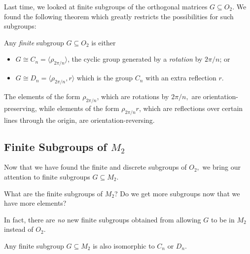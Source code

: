 Last time, we looked at finite subgroups of the orthogonal matrices $G \subseteq O_2.$ We found the following theorem which greatly restricts the possibilities for such subgroups:
\begin{theorem}\label{everything is cn or dn}
Any \emph{finite} subgroup $G \subseteq O_2$ is either 
\begin{itemize}
    \item $G \cong C_n = \langle \rho_{2\pi/n} \rangle$, the cyclic group generated by a \emph{rotation} by $2\pi/n$; or
    \item $G\cong D_n = \langle \rho_{2\pi/n}, r \rangle $ which is the group $C_n$ with an extra reflection $r.$  
\end{itemize}
\end{theorem}

The elements of the form $\rho_{2\pi/n}$, which are rotations by $2\pi/n,$ are orientation-preserving, while elements of the form $\rho_{2\pi / n}r$, which are reflections over certain lines through the origin, are orientation-reversing.


\subsection{Finite Subgroups of \texorpdfstring{$M_2$}{M2}}

Now that we have found the finite and discrete subgroups of $O_2,$ we bring our attention to finite subgroups $G \subseteq M_2.$
\begin{qq}
What are the finite subgroups of $M_2$? Do we get more subgroups now that we have more elements?
\end{qq}

In fact, there are \emph{no} new finite subgroups obtained from allowing $G$ to be in $M_2$ instead of $O_2.$ 

\begin{theorem}
Any finite subgroup $G \subseteq M_2$ is also isomorphic to $C_n$ or $D_n.$
\end{theorem}

